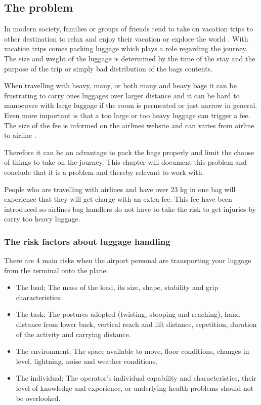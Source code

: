 \subsection{The problem}
In modern society, families or groups of friends tend to take on vacation trips to other destination to relax and enjoy their vacation or explore the world \citep{danskecharter}.
With vacation trips comes packing luggage which plays a role regarding the journey. The size and weight of the luggage is determined by the time of the stay and the purpose of the trip or simply bad distribution of the bags contents.

When travelling with heavy, many, or both many and heavy bags it can be frustrating to carry ones luggages over larger distance and it can be hard to manoeuvre with large luggage if the room is permeated or just narrow in general. Even more important is that a too large or too heavy luggage can trigger a fee. The size of the fee is informed on the airlines website and can varies from airline to airline \citep{altombag}.

Therefore it can be an advantage to pack the bags properly and limit the choose of things to take on the journey.
This chapter will document this problem and conclude that it is a problem and thereby relevant to work with.

People who are travelling with airlines and have over 23 kg in one bag will experience that they will get charge with an extra fee. This fee have been introduced so airlines bag handlers do not have to take the risk to get injuries by carry too heavy luggage.

\subsubsection{The risk factors about luggage handling}

There are 4 main risks when the airport personal are transporting your luggage from the terminal onto the plane:

\begin{itemize}
\item The load; The mass of the load, its size, shape, stability and grip characteristics.
\item The task; The postures adopted (twisting, stooping and reaching), hand distance from lower back, vertical reach and lift distance, repetition, duration of the activity and carrying distance.
\item The environment; The space available to move, floor conditions, changes in level, lightning, noise and weather conditions.
\item The individual; The operator's individual capability and characteristics, their level of knowledge and experience, or underlying health problems should not be overlooked.
\end{itemize}

